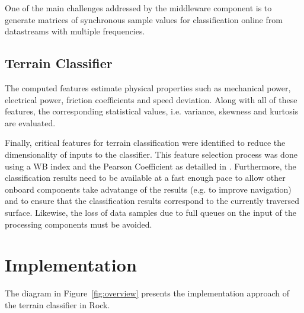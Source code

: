 \documentclass{article}
\begin{document}
One of the main challenges addressed by the middleware component is to generate matrices of synchronous sample values for classification online from datastreams with multiple frequencies.






\subsection{Terrain Classifier}


The computed features estimate physical properties such as mechanical power, electrical power, friction coefficients and speed deviation. Along with all of these features, the corresponding statistical values, i.e. variance, skewness and kurtosis are evaluated. 

Finally, critical features for terrain classification were identified to reduce the dimensionality of inputs to the classifier.
This feature selection process was done using a WB index and the Pearson Coefficient as detailled in \cite{Dimastrogiovanni2020}. 
Furthermore, the classification results need to be available at a fast enough pace to allow other onboard components take advatange of the results (e.g. to improve navigation) and to ensure that the classification results correspond to the currently traversed surface. 
Likewise, the loss of data samples due to full queues on the input of the processing components must be avoided. 

\section{Implementation}

The diagram in Figure~\ref{fig:overview} presents the implementation approach of the terrain classifier in Rock.
\end{document}
